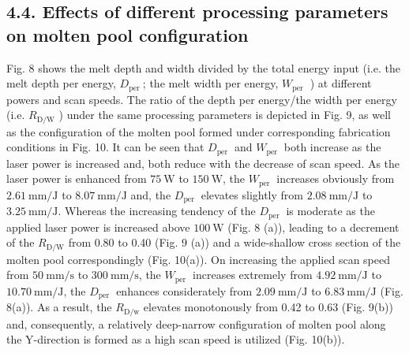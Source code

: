 \documentclass[10pt]{article}
\begin{document}
\subsection*{4.4. Effects of different processing parameters on molten pool configuration}
Fig. 8 shows the melt depth and width divided by the total energy input (i.e. the melt depth per energy, $D_{\text {per }}$; the melt width per energy, $W_{\text {per }}$ ) at different powers and scan speeds. The ratio of the depth per energy/the width per energy (i.e. $R_{\mathrm{D} / \mathrm{W}}$ ) under the same processing parameters is depicted in Fig. 9, as well as the configuration of the molten pool formed under corresponding fabrication conditions in Fig. 10. It can be seen that $D_{\text {per }}$ and $W_{\text {per }}$ both increase as the laser power is increased and, both reduce with the decrease of scan speed. As the laser power is enhanced from $75 \mathrm{~W}$ to $150 \mathrm{~W}$, the $W_{\text {per }}$ increases obviously from $2.61 \mathrm{~mm} / \mathrm{J}$ to $8.07 \mathrm{~mm} / \mathrm{J}$ and, the $D_{\text {per }}$ elevates slightly from $2.08 \mathrm{~mm} / \mathrm{J}$ to $3.25 \mathrm{~mm} / \mathrm{J}$. Whereas the increasing tendency of the $D_{\text {per }}$ is moderate as the applied laser power is increased above $100 \mathrm{~W}$ (Fig. 8 (a)), leading to a decrement of the $R_{\mathrm{D} / \mathrm{W}}$ from 0.80 to 0.40 (Fig. 9 (a)) and a wide-shallow cross section of the molten pool correspondingly (Fig. 10(a)). On increasing the applied scan speed from $50 \mathrm{~mm} / \mathrm{s}$ to $300 \mathrm{~mm} / \mathrm{s}$, the $W_{\text {per }}$ increases extremely from $4.92 \mathrm{~mm} / \mathrm{J}$ to $10.70 \mathrm{~mm} / \mathrm{J}$, the $D_{\text {per }}$ enhances considerately from $2.09 \mathrm{~mm} / \mathrm{J}$ to $6.83 \mathrm{~mm} / \mathrm{J}$ (Fig. 8(a)). As a result, the $R_{\mathrm{D} / \mathrm{w}}$ elevates monotonously from 0.42 to 0.63 (Fig. 9(b)) and, consequently, a relatively deep-narrow configuration of molten pool along the Y-direction is formed as a high scan speed is utilized (Fig. 10(b)).
\end{document}
